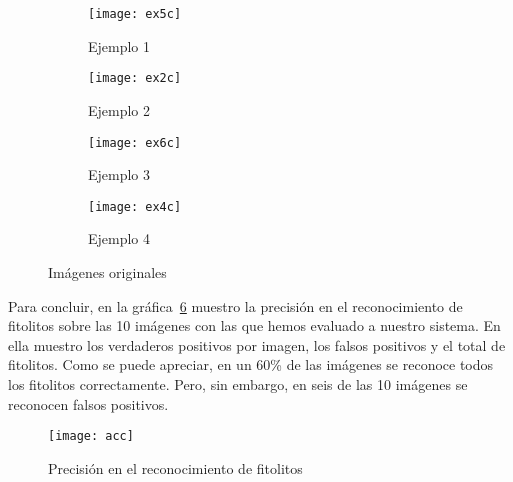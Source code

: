 \begin{figure}
	\centering
	\begin{subfigure}[b]{0.45\textwidth}
        \texttt{[image: ex5c]}
        \caption{Ejemplo 1}
        \label{subfig:fej1c}
    \end{subfigure}
    \begin{subfigure}[b]{0.45\textwidth}
        \texttt{[image: ex2c]}
        \caption{Ejemplo 2}
        \label{subfig:fej2c}
    \end{subfigure}
    \begin{subfigure}[b]{0.45\textwidth}
        \texttt{[image: ex6c]}
        \caption{Ejemplo 3}
        \label{subfig:fe3c}
    \end{subfigure}
    \begin{subfigure}[b]{0.45\textwidth}
        \texttt{[image: ex4c]}
        \caption{Ejemplo 4}
        \label{subfig:fe4c}
    \end{subfigure}
        \caption{Imágenes originales}
	\label{fig:5.18}
\end{figure}

Para concluir, en la gráfica~\ref{fig:acc} muestro la precisión en el reconocimiento de fitolitos sobre las 10 imágenes con las que hemos evaluado a nuestro sistema. En ella muestro los verdaderos positivos por imagen, los falsos positivos y el total de fitolitos. Como se puede apreciar, en un 60\% de las imágenes se reconoce todos los fitolitos correctamente. Pero, sin embargo, en seis de las 10 imágenes se reconocen falsos positivos.

\begin{figure}
\centering
\texttt{[image: acc]}
\caption{Precisión en el reconocimiento de fitolitos}
\label{fig:acc}
\end{figure}